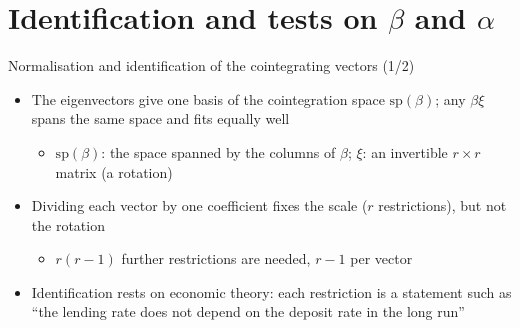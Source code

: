 \section{Identification and tests on $\beta$ and $\alpha$}

\begin{frame}{Normalisation and identification of the cointegrating vectors (1/2)}
\itemsize{\small}
\begin{itemize}
    \item The eigenvectors give one basis of the cointegration space $\mathrm{sp}(\beta)$; any $\beta\xi$ spans the same space and fits equally well
    \begin{itemize}
        \item $\mathrm{sp}(\beta)$: the space spanned by the columns of $\beta$; $\xi$: an invertible $r\times r$ matrix (a rotation)
    \end{itemize}
    \item Dividing each vector by one coefficient fixes the scale ($r$ restrictions), but not the rotation
    \begin{itemize}
        \item $r(r - 1)$ further restrictions are needed, $r - 1$ per vector
    \end{itemize}
    \item Identification rests on economic theory: each restriction is a statement such as ``the lending rate does not depend on the deposit rate in the long run''
\end{itemize}
\end{frame}

